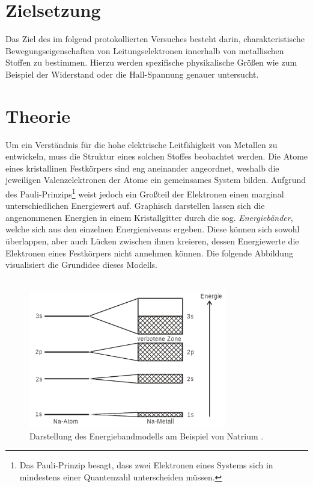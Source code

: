 %

%
\section{Zielsetzung}

Das Ziel des im folgend protokollierten Versuches besteht darin, charakteristische Bewegungseigenschaften
von Leitungselektronen innerhalb von metallischen Stoffen zu bestimmen. Hierzu werden spezifische physikalische
Größen wie zum Beispiel der Widerstand oder die Hall-Spannung genauer untersucht.

\section{Theorie}
\label{sec:Theorie}

Um ein Verständnis für die hohe elektrische Leitfähigkeit von Metallen zu entwickeln, muss die Struktur eines solchen 
Stoffes beobachtet werden. Die Atome eines kristallinen Festkörpers sind eng aneinander angeordnet, weshalb die jeweiligen
Valenzelektronen der Atome ein gemeinsames System bilden. Aufgrund des Pauli-Prinzips\footnote{Das Pauli-Prinzip besagt, 
dass zwei Elektronen eines Systems sich in mindestens einer Quantenzahl unterscheiden müssen.} weist jedoch ein Großteil 
der Elektronen einen marginal unterschiedlichen Energiewert auf. Graphisch darstellen lassen sich die angenommenen Energien 
in einem Kristallgitter durch die sog. \emph{Energiebänder}, welche sich aus den einzelnen Energieniveaus ergeben. Diese 
können sich sowohl überlappen, aber auch Lücken zwischen ihnen kreieren, dessen Energiewerte die Elektronen eines Festkörpers 
nicht annehmen können. Die folgende Abbildung visualisiert die Grundidee dieses Modells.\\\\

\begin{figure}[H]
    \centering
    \includegraphics[height=6cm]{content/Energiebandmodell.png}
    \caption{Darstellung des Energiebandmodells am Beispiel von Natrium \cite{Versuchsanleitung_v511}.}
    \label{fig:Energiebandmodell}
\end{figure}

